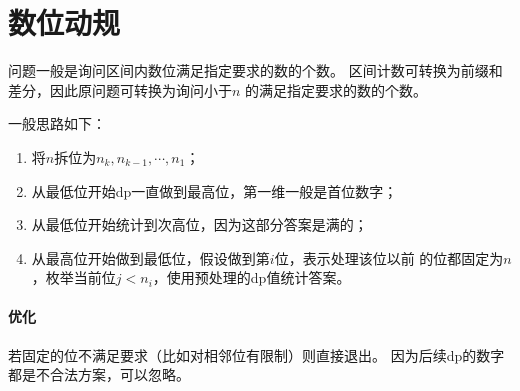 \section{数位动规}
问题一般是询问区间内数位满足指定要求的数的个数。
区间计数可转换为前缀和差分，因此原问题可转换为询问小于$n$
的满足指定要求的数的个数。

一般思路如下：
\begin{enumerate}
	\item 将$n$拆位为$n_k,n_{k-1},\cdots,n_1$；
	\item 从最低位开始dp一直做到最高位，第一维一般是首位数字；
	\item 从最低位开始统计到次高位，因为这部分答案是满的；
	\item 从最高位开始做到最低位，假设做到第$i$位，表示处理该位以前
	      的位都固定为$n$，枚举当前位$j<n_i$，使用预处理的dp值统计答案。
\end{enumerate}

\paragraph{优化} 若固定的位不满足要求（比如对相邻位有限制）则直接退出。
因为后续dp的数字都是不合法方案，可以忽略。
